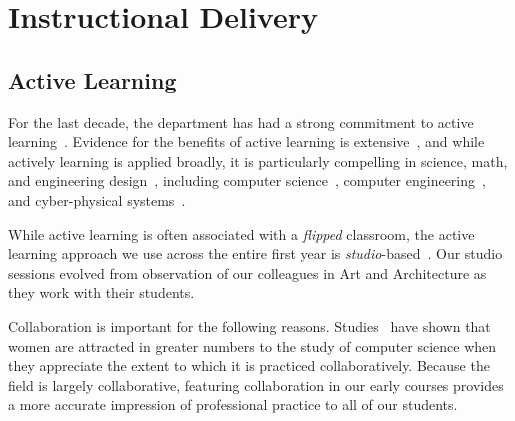 \section{Instructional Delivery}
\label{sec:delivery}

\subsection{Active Learning}

For the last decade, the department has had a strong commitment to
active learning~\cite{scbggg10}.
Evidence for the benefits of active learning is
extensive~\cite{Prince04}, %
and while actively learning is applied broadly, it is particularly
compelling in science, math, and engineering
design~\cite{Freeman14},  %
including computer science~\cite{ag13}, %
computer engineering~\cite{sr02}, %
and cyber-physical systems~\cite{me14}. %

While active learning is often associated with a \emph{flipped} classroom, %
the active learning approach we use across the entire
first year is \emph{studio}-based~\cite{hnc08}.
Our studio sessions evolved from observation of our colleagues in
Art and Architecture as they work with their students.

Collaboration is important for the following reasons.
Studies~\cite{Krause:2012:EFL:2157136.2157192} have shown that women are
attracted in greater numbers to the study of computer science when they
appreciate the extent to which it is practiced collaboratively.  Because
the field is largely collaborative,
featuring collaboration
in our early courses provides a more accurate impression of professional
practice to all of our students. 

